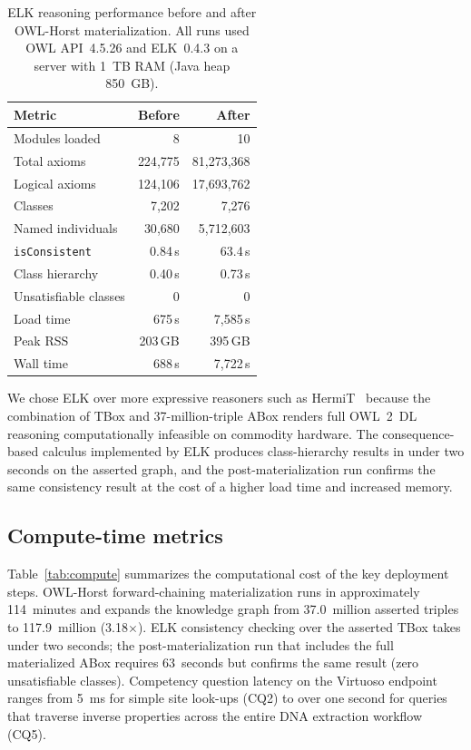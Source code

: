 \documentclass[11pt,a4paper]{article}
\begin{document}
\begin{table}[h]
\centering
\caption{ELK reasoning performance before and after OWL-Horst
  materialization. All runs used OWL API~4.5.26 and ELK~0.4.3 on a
  server with 1~TB RAM (Java heap 850~GB).}
\label{tab:elk}
\small
\begin{tabular}{lrr}
\toprule
\textbf{Metric} & \textbf{Before} & \textbf{After} \\
\midrule
Modules loaded            & 8             & 10 \\
Total axioms              & 224{,}775     & 81{,}273{,}368 \\
Logical axioms            & 124{,}106     & 17{,}693{,}762 \\
Classes                   & 7{,}202       & 7{,}276 \\
Named individuals         & 30{,}680      & 5{,}712{,}603 \\
\texttt{isConsistent}     & 0.84\,s       & 63.4\,s \\
Class hierarchy           & 0.40\,s       & 0.73\,s \\
Unsatisfiable classes     & 0             & 0 \\
Load time                 & 675\,s        & 7{,}585\,s \\
Peak RSS                  & 203\,GB       & 395\,GB \\
Wall time                 & 688\,s        & 7{,}722\,s \\
\bottomrule
\end{tabular}
\end{table}

We chose ELK over more expressive reasoners such as HermiT~\cite{hermit}
because the combination of TBox and 37-million-triple ABox
renders full OWL~2~DL reasoning computationally infeasible on commodity
hardware. The consequence-based calculus implemented by ELK
produces class-hierarchy results in under two seconds on the asserted
graph, and the post-materialization run confirms the same consistency
result at the cost of a higher load time and increased memory.

\subsection{Compute-time metrics}\label{sec:compute_metrics}

Table~\ref{tab:compute} summarizes the computational cost of the
key deployment steps. OWL-Horst forward-chaining materialization
runs in approximately 114~minutes and expands the knowledge graph
from 37.0~million asserted triples to 117.9~million
(3.18$\times$). ELK consistency checking over the asserted TBox
takes under two seconds; the post-materialization run that
includes the full materialized ABox requires 63~seconds but
confirms the same result (zero unsatisfiable classes). Competency
question latency on the Virtuoso endpoint ranges from 5~ms for
simple site look-ups (CQ2) to over one second for queries that
traverse inverse properties across the entire DNA extraction
workflow (CQ5).
\end{document}
